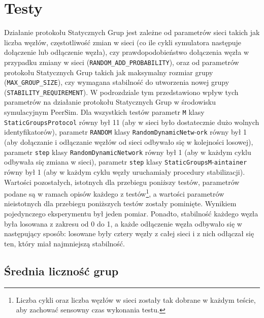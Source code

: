 \documentclass[12pt, twoside, openany]{report}
\begin{document}
\section{Testy}
Działanie protokołu Statycznych Grup jest zależne od parametrów sieci takich jak liczba węzłów, częstotliwość zmian w sieci (co ile cykli symulatora następuje dołączenie lub odłączenie węzła), czy prawdopodobieństwo  dołączenia węzła w przypadku zmiany w sieci (\texttt{RANDOM\_ADD\_PROBABILITY}), oraz od parametrów protokołu Statycznych Grup takich jak maksymalny rozmiar grupy (\texttt{MAX\_GROUP\_SIZE}), czy wymagana stabilność do utworzenia nowej grupy (\texttt{STABILITY\_REQUIREMENT}). W podrozdziale tym przedstawiono wpływ tych parametrów na działanie protokołu Statycznych Grup w środowisku symulacyjnym PeerSim. Dla wszystkich testów parametr \texttt{M} klasy \texttt{StaticGroupsProtocol} równy był 11 (aby w sieci było dostatecznie dużo wolnych identyfikatorów), parametr \texttt{RANDOM} klasy \texttt{RandomDynamicNetw}-\texttt{ork} równy był 1 (aby dołączanie i odłączanie węzłów od sieci odbywało się w kolejności losowej), parametr \texttt{step} klasy \texttt{RandomDynamicNetwork} równy był 1 (aby w każdym cyklu odbywała się zmiana w sieci), parametr \texttt{step} klasy \texttt{StaticGroupsM}-\texttt{aintainer} równy był 1 (aby w każdym cyklu węzły uruchamiały procedury stabilizacji). Wartości pozostałych, istotnych dla przebiegu poniższy testów, parametrów podane są w ramach opisów każdego z testów\footnote{Liczba cykli oraz liczba węzłów w sieci zostały tak dobrane w każdym teście, aby zachować sensowny czas wykonania testu.}, a wartości parametrów nieistotnych dla przebiegu poniższych testów zostały pominięte. Wynikiem pojedynczego eksperymentu był jeden pomiar. Ponadto, stabilność każdego węzła była losowana z zakresu od 0 do 1, a każde odłączenie węzła odbywało się w następujący sposób: losowane były cztery węzły z całej sieci i z nich odłączał się ten, który miał najmniejszą stabilność.

\subsection{Średnia liczność grup}
\end{document}

